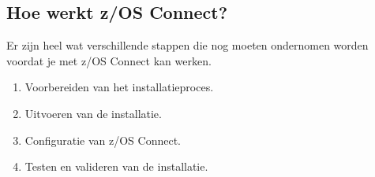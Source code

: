 \subsection{Hoe werkt z/OS Connect?}
\label{sec:Hoe werkt z/OS Connect?}
Er zijn heel wat verschillende stappen die nog moeten ondernomen worden voordat je met z/OS Connect kan werken.
\begin{enumerate}
    \item Voorbereiden van het installatieproces.
    \item Uitvoeren van de installatie.
    \item Configuratie van z/OS Connect.
    \item Testen en valideren van de installatie.
\end{enumerate}
\\ \\
